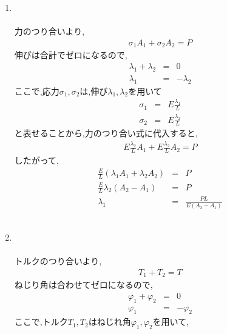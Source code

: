 \documentclass[a4paper]{jsarticle}
\begin{document}
\begin{enumerate}[(1)]
    \item {}\\
          \\
          力のつり合いより,
          \begin{eqnarray*}
              \sigma_1A_1+\sigma_2A_2=P
          \end{eqnarray*}
          伸びは合計でゼロになるので,
          \begin{eqnarray*}
              \lambda_1+\lambda_2&=&0\\
              \lambda_1&=&-\lambda_2
          \end{eqnarray*}
          ここで,応力$\sigma_1,\sigma_2$は,伸び$\lambda_1,\lambda_2$を用いて
          \begin{eqnarray*}
              \sigma_1&=&E\frac{\lambda_1}{L}\\
              \sigma_2&=&E\frac{\lambda_2}{L}
          \end{eqnarray*}
          と表せることから,力のつり合い式に代入すると,
          \begin{eqnarray*}
              E\frac{\lambda_2}{L}A_1+E\frac{\lambda_2}{L}A_2=P
          \end{eqnarray*}
          したがって,
          \begin{eqnarray*}
              \frac{E}{L}\left(\lambda_1A_1+\lambda_2A_2\right)&=&P\\
              \frac{E}{L}\lambda_2\left(A_2-A_1\right)&=&P\\
              \lambda_1&=&\frac{PL}{E\left(A_2-A_1\right)}
          \end{eqnarray*}\\
    \item {}\\
          \\
          トルクのつり合いより,
          \begin{eqnarray*}
              T_1+T_2=T
          \end{eqnarray*}
          ねじり角は合わせてゼロになるので,
          \begin{eqnarray*}
              \varphi_1+\varphi_2&=&0\\
              \varphi_1&=&-\varphi_2
          \end{eqnarray*}
          ここで,トルク$T_1,T_2$はねじれ角$\varphi_1,\varphi_2$を用いて,

\end{enumerate}
\end{document}
